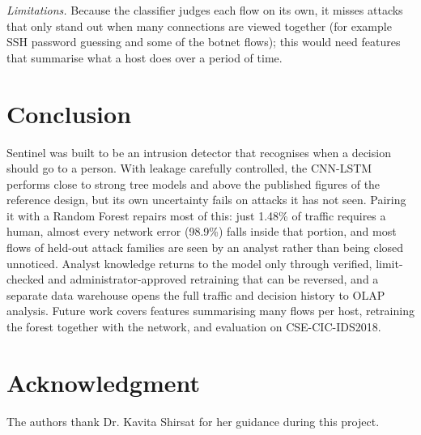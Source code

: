 \documentclass[conference]{IEEEtran}
\begin{document}
\textit{Limitations.} Because the classifier judges each flow on its own, it misses attacks that
only stand out when many connections are viewed together (for example SSH password guessing and
some of the botnet flows); this would need features that summarise what a host does over a period
of time.

\section{Conclusion}
Sentinel was built to be an intrusion detector that recognises when a decision should go to a
person. With leakage carefully controlled, the CNN-LSTM performs close to strong tree models and
above the published figures of the reference design, but its own uncertainty fails on attacks it
has not seen. Pairing it with a Random Forest repairs most of this: just 1.48\% of traffic requires
a human, almost every network error (98.9\%) falls inside that portion, and most flows of held-out
attack families are seen by an analyst rather than being closed unnoticed. Analyst knowledge returns to the
model only through verified, limit-checked and administrator-approved retraining that can be
reversed, and a separate data warehouse opens the full traffic and decision history to OLAP
analysis. Future work covers features summarising many flows per host, retraining the forest
together with the network, and evaluation on CSE-CIC-IDS2018.

\section*{Acknowledgment}
The authors thank Dr. Kavita Shirsat for her guidance during this project.
\end{document}

